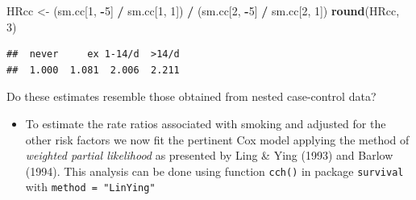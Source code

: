 \documentclass[
]{book}
\newenvironment{Shaded}{\begin{snugshade}}{\end{snugshade}}
\newcommand{\AttributeTok}[1]{\textcolor[rgb]{0.13,0.29,0.53}{#1}}
\newcommand{\ConstantTok}[1]{\textcolor[rgb]{0.56,0.35,0.01}{#1}}
\newcommand{\DecValTok}[1]{\textcolor[rgb]{0.00,0.00,0.81}{#1}}
\newcommand{\FunctionTok}[1]{\textcolor[rgb]{0.13,0.29,0.53}{\textbf{#1}}}
\newcommand{\NormalTok}[1]{#1}
\newcommand{\OtherTok}[1]{\textcolor[rgb]{0.56,0.35,0.01}{#1}}
\newcommand{\SpecialCharTok}[1]{\textcolor[rgb]{0.81,0.36,0.00}{\textbf{#1}}}
\newcommand{\StringTok}[1]{\textcolor[rgb]{0.31,0.60,0.02}{#1}}
\providecommand{\tightlist}{%
  \setlength{\itemsep}{0pt}\setlength{\parskip}{0pt}}
\theoremstyle{definition}
\theoremstyle{definition}
\theoremstyle{definition}
\theoremstyle{definition}
\theoremstyle{remark}
\begin{document}
\begin{Shaded}
\begin{Highlighting}[]
\NormalTok{HRcc }\OtherTok{\textless{}{-}} 
\NormalTok{  (sm.cc[}\DecValTok{1}\NormalTok{, }\SpecialCharTok{{-}}\DecValTok{5}\NormalTok{] }\SpecialCharTok{/}\NormalTok{ sm.cc[}\DecValTok{1}\NormalTok{, }\DecValTok{1}\NormalTok{]) }\SpecialCharTok{/}\NormalTok{ (sm.cc[}\DecValTok{2}\NormalTok{, }\SpecialCharTok{{-}}\DecValTok{5}\NormalTok{] }\SpecialCharTok{/}\NormalTok{ sm.cc[}\DecValTok{2}\NormalTok{, }\DecValTok{1}\NormalTok{])}
\FunctionTok{round}\NormalTok{(HRcc, }\DecValTok{3}\NormalTok{)}
\end{Highlighting}
\end{Shaded}

\begin{verbatim}
##  never     ex 1-14/d  >14/d 
##  1.000  1.081  2.006  2.211
\end{verbatim}

Do these estimates resemble those obtained from nested case-control data?

\begin{itemize}
\tightlist
\item
  To estimate the rate ratios associated with smoking and adjusted for the
  other risk factors we now fit the pertinent Cox model
  applying the method of \emph{weighted partial likelihood} as
  presented by Ling \& Ying (1993) and Barlow (1994).
  This analysis can be done using function \texttt{cch()}
  in package \texttt{survival} with \texttt{method\ =\ "LinYing"}
\end{itemize}

\begin{Shaded}
\end{Shaded}
\end{document}
